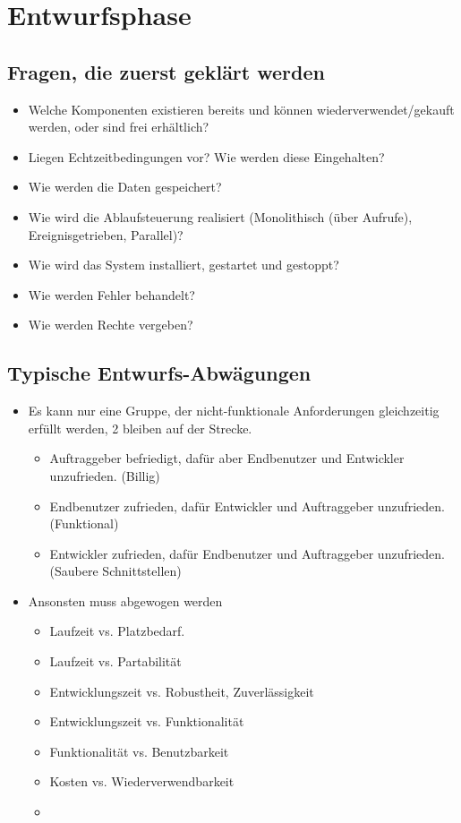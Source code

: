 \section{Entwurfsphase}
\subsection{Fragen, die zuerst geklärt werden}
\begin{itemize}
    \item Welche Komponenten existieren bereits und können wiederverwendet/gekauft werden, oder sind frei erhältlich?
    \item Liegen Echtzeitbedingungen vor? Wie werden diese Eingehalten?
    \item Wie werden die Daten gespeichert?
    \item Wie wird die Ablaufsteuerung realisiert (Monolithisch (über Aufrufe), Ereignisgetrieben, Parallel)?
    \item Wie wird das System installiert, gestartet und gestoppt?
    \item Wie werden Fehler behandelt?
    \item Wie werden Rechte vergeben?
\end{itemize}

\subsection{Typische Entwurfs-Abwägungen}
\begin{itemize}
    \item Es kann nur eine Gruppe, der nicht-funktionale Anforderungen gleichzeitig erfüllt werden, 2 bleiben auf der Strecke.
    \begin{itemize}
        \item Auftraggeber befriedigt, dafür aber Endbenutzer und Entwickler unzufrieden. (Billig)
        \item Endbenutzer zufrieden, dafür Entwickler und Auftraggeber unzufrieden. (Funktional)
        \item Entwickler zufrieden, dafür Endbenutzer und Auftraggeber unzufrieden. (Saubere Schnittstellen)
    \end{itemize}
    \item Ansonsten muss abgewogen werden
    \begin{itemize}
        \item Laufzeit vs. Platzbedarf.
        \item Laufzeit vs. Partabilität
        \item Entwicklungszeit vs. Robustheit, Zuverlässigkeit
        \item Entwicklungszeit vs. Funktionalität
        \item Funktionalität vs. Benutzbarkeit
        \item Kosten vs. Wiederverwendbarkeit
        \item {}
    \end{itemize}
\end{itemize}